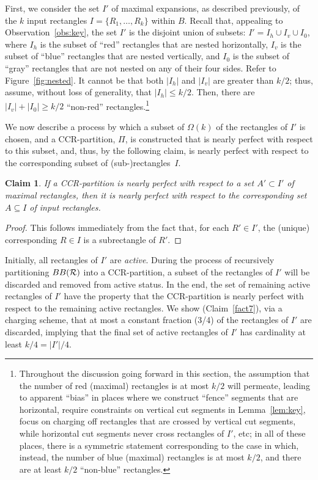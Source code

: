 \documentclass{article}
\newcommand{\B}{BB({\cal R})}
\newtheorem{claim}[theorem]{Claim}
\begin{document}
  First, we consider the set $I'$ of maximal expansions, as described
  previously, of the $k$ input rectangles $I=\{R_1,\ldots,R_k\}$
  within $B$.  Recall that, appealing to Observation~\ref{obs:key},
  the set $I'$ is the disjoint union of subsets: $I'=I_h \cup I_v \cup
  I_0$, where $I_h$ is the subset of ``red'' rectangles that are
  nested horizontally, $I_v$ is the subset of ``blue'' rectangles that
  are nested vertically, and $I_0$ is the subset of ``gray''
  rectangles that are not nested on any of their four sides.  Refer to
  Figure~\ref{fig:nested}.  It cannot be that both $|I_h|$ and $|I_v|$
  are greater than $k/2$; thus, assume, without loss of generality,
  that $|I_h|\leq k/2$. Then, there are $|I_v|+|I_0| \geq k/2$
  ``non-red'' rectangles.\footnote{Throughout the discussion going
    forward in this section, the assumption that the number of red
    (maximal) rectangles is at most $k/2$ will permeate, leading to
    apparent ``bias'' in places where we construct ``fence'' segments
    that are horizontal, require constraints on vertical cut segments
    in Lemma~\ref{lem:key}, focus on charging off rectangles that are
    crossed by vertical cut segments, while horizontal cut segments
    never cross rectangles of $I'$, etc; in all of these places, there is a
    symmetric statement corresponding to the case in which, instead,
    the number of blue (maximal) rectangles is at most $k/2$, and
    there are at least $k/2$ ``non-blue'' rectangles.}

We now describe a process by which a subset of $\Omega(k)$ of the
rectangles of $I'$ is chosen, and a CCR-partition, $\Pi$, is
constructed that is nearly perfect with respect to this subset, and,
thus, by the following claim, is nearly perfect with respect to the
corresponding subset of (sub-)rectangles~$I$.

\begin{claim}\label{claim:1}
  If a CCR-partition is nearly perfect with respect to a set
  $A'\subset I'$ of maximal rectangles, then it is nearly perfect with
  respect to the corresponding set $A\subseteq I$ of input rectangles.
\end{claim}

\begin{proof}
  This follows immediately from the fact that, for each $R'\in I'$,
  the (unique) corresponding $R\in I$ is a subrectangle of $R'$.
\end{proof}

Initially, all rectangles of $I'$ are {\em active}.
%
During the process of recursively partitioning $\B$ into a
CCR-partition, a subset of the rectangles of $I'$ will be discarded
and removed from active status.  In the end, the set of remaining
active rectangles of $I'$ have the property that the CCR-partition is
nearly perfect with respect to the remaining active rectangles.  We
show (Claim~\ref{fact7}), via a charging scheme, that at most a
constant fraction (3/4) of the rectangles of $I'$ are discarded,
implying that the final set of active rectangles of $I'$ has
cardinality at least $k/4=|I'|/4$.
%
\end{document}
